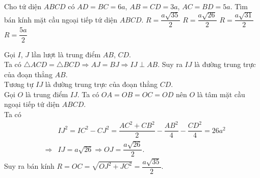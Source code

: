 \begin{ex}%
 Cho tứ diện $ABCD$ có $AD=BC=6a$, $AB=CD=3a$, $AC=BD=5a$. Tìm bán kính mặt cầu ngoại tiếp tứ diện $ABCD$.
 \choice
  {\True $R = \dfrac{a\sqrt{35}}{2}$}
  {$R=\dfrac{a\sqrt{26}}{2}$}
  {$R=\dfrac{a\sqrt{31}}{2}$}
  {$R=\dfrac{5a}{2}$}
 \loigiai
  {
  \immini
  {
  Gọi $I$, $J$ lần lượt là trung điểm $AB$, $CD$. \\
  Ta có $\triangle ACD = \triangle BCD \Rightarrow AJ = BJ \Rightarrow IJ \perp AB$. Suy ra $IJ$ là đường trung trực của đoạn thẳng $AB$.\\
  Tương tự $IJ$ là đường trung trực của đoạn thẳng $CD$. \\
  Gọi $O$ là trung điểm $IJ$. Ta có $OA=OB=OC=OD$ nên $O$ là tâm mặt cầu ngoại tiếp tứ diện $ABCD$.\\
  Ta có
  \begin{eqnarray*}
   & & IJ^2=IC^2-CJ^2=\dfrac{AC^2+CB^2}{2}-\dfrac{AB^2}{4}-\dfrac{CD^2}{4}=26a^2\\
   &\Rightarrow & IJ=a\sqrt{26}\Rightarrow OJ=\dfrac{a\sqrt{26}}{2}.
  \end{eqnarray*}
  Suy ra bán kính $R=OC=\sqrt{OJ^2+JC^2}= \dfrac{a\sqrt{35}}{2}$.
  }
  {
  }
  }
\end{ex}


